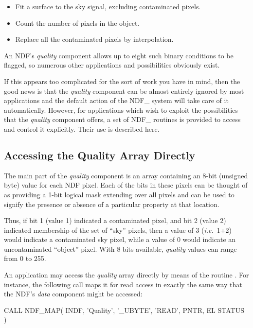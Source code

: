 \documentclass[twoside,11pt,nolof]{starlink}
\providecommand{\st}[1]{{\emph{#1}}}
\begin{document}
\begin{itemize}
\item Fit a surface to the sky signal, excluding contaminated pixels.
\item Count the number of pixels in the object.
\item Replace all the contaminated pixels by interpolation.
\end{itemize}

An NDF's \st{quality\/} component allows up to eight such binary conditions to be
flagged, so numerous other applications and possibilities obviously exist.

If this appears too complicated for the sort of work you have in mind, then  the
good news is that the \st{quality\/} component can be almost entirely ignored  by
most applications and the default action of the NDF\_ system will take  care of
it automatically.
However, for applications which wish to exploit the possibilities that the
\st{quality\/} component offers, a set of NDF\_ routines is provided to access
and  control it explicitly.
Their use is described here.

\subsection{Accessing the Quality Array Directly}

The main part of the \st{quality\/} component is an array containing an 8-bit
(unsigned byte) value for each NDF pixel.
Each of the bits in these pixels can be thought of as providing a 1-bit
logical mask extending over all pixels and can be used to signify the
presence or absence of a particular property at that location.

Thus, if bit 1 (value 1) indicated a contaminated pixel, and bit 2 (value 2)
indicated membership of the set of ``sky'' pixels, then a value of 3
(\st{i.e.}\ 1+2) would indicate a contaminated sky pixel, while a
value of 0
would indicate an uncontaminated ``object'' pixel.
With 8 bits available, \st{quality\/} values can range from 0 to 255.

An application may access the \st{quality\/} array directly by means of the
routine  .
For instance, the following call maps it for read access in exactly the same
way that the NDF's \st{data\/} component might be accessed:

\small
\begin{terminalv}
      CALL NDF_MAP( INDF, 'Quality', '_UBYTE', 'READ', PNTR, EL STATUS )
\end{terminalv}
\normalsize
\end{document}
